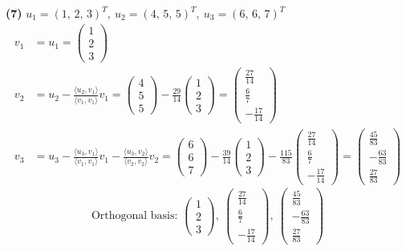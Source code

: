 \noindent\textbf{(7)} $u_1=(1,\,2,\,3)^T,\ u_2=(4,\,5,\,5)^T,\ u_3=(6,\,6,\,7)^T$
\begin{align*}
v_1&=u_1=\begin{pmatrix}1 \\ 2 \\ 3\end{pmatrix} \\
v_2&=u_2-\frac{\langle u_2,v_1\rangle}{\langle v_1,v_1\rangle}v_1=\begin{pmatrix}4 \\ 5 \\ 5\end{pmatrix}-\frac{29}{14}\begin{pmatrix}1 \\ 2 \\ 3\end{pmatrix}=\begin{pmatrix}\frac{27}{14} \\ \frac{6}{7} \\ - \frac{17}{14}\end{pmatrix} \\
v_3&=u_3-\frac{\langle u_3,v_1\rangle}{\langle v_1,v_1\rangle}v_1-\frac{\langle u_3,v_2\rangle}{\langle v_2,v_2\rangle}v_2=\begin{pmatrix}6 \\ 6 \\ 7\end{pmatrix}-\frac{39}{14}\begin{pmatrix}1 \\ 2 \\ 3\end{pmatrix} -\frac{115}{83}\begin{pmatrix}\frac{27}{14} \\ \frac{6}{7} \\ - \frac{17}{14}\end{pmatrix}=\begin{pmatrix}\frac{45}{83} \\ - \frac{63}{83} \\ \frac{27}{83}\end{pmatrix}
\end{align*}
\[ \text{Orthogonal basis: }\begin{pmatrix}1 \\ 2 \\ 3\end{pmatrix},\ \begin{pmatrix}\frac{27}{14} \\ \frac{6}{7} \\ - \frac{17}{14}\end{pmatrix},\ \begin{pmatrix}\frac{45}{83} \\ - \frac{63}{83} \\ \frac{27}{83}\end{pmatrix} \]
